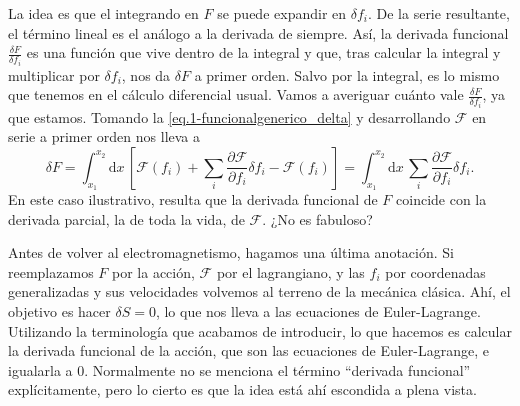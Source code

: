 La idea es que el integrando en \(F\) se puede expandir en \(\delta f_i\). De la serie resultante, el término lineal es el análogo a la derivada de siempre. Así, la derivada funcional \(\frac{\delta F}{\delta f_i}\) es una función que vive dentro de la integral y que, tras calcular la integral y multiplicar por \(\delta f_i\), nos da \(\delta F\) a primer orden. Salvo por la integral, es lo mismo que tenemos en el cálculo diferencial usual.  Vamos a averiguar cuánto vale \(\frac{\delta F}{\delta f_i}\), ya que estamos. Tomando la \cref{eq.1-funcionalgenerico_delta} y desarrollando \(\mathcal{F}\) en serie a primer orden nos lleva a
\begin{equation}
    \delta F = \int_{x_1}^{x_2}\mathrm{d}x\, \left[\mathcal{F}(f_i) + \sum_i \frac{\partial \mathcal{F}}{\partial f_i} \delta f_i - \mathcal{F}(f_i)\right] = \int_{x_1}^{x_2}\mathrm{d}x\, \sum_i \frac{\partial \mathcal{F}}{\partial f_i}\delta f_i.
\end{equation}
En este caso ilustrativo, resulta que la derivada funcional de \(F\) coincide con la derivada parcial, la de toda la vida, de \(\mathcal{F}\). ¿No es fabuloso?

Antes de volver al electromagnetismo, hagamos una última anotación. Si reemplazamos \(F\) por la acción, \(\mathcal{F}\) por el lagrangiano, y las \(f_i\) por coordenadas generalizadas y sus velocidades volvemos al terreno de la mecánica clásica. Ahí, el objetivo es hacer \(\delta S = 0\), lo que nos lleva a las ecuaciones de Euler-Lagrange. Utilizando la terminología que acabamos de introducir, lo que hacemos es calcular la derivada funcional de la acción, que son las ecuaciones de Euler-Lagrange, e igualarla a 0. Normalmente no se menciona el término ``derivada funcional'' explícitamente, pero lo cierto es que la idea está ahí escondida a plena vista.

